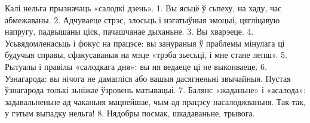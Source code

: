 Калі нельга прызначаць «салодкі дзень».
1. Вы ясьцё ў сьпеху, на хаду, час абмежаваны.
2. Адчуваеце стрэс, злосьць і нэгатыўныя эмоцыі, цягліцавую напругу, падвышаны ціск, пачашчанае дыханьне.
3. Вы хварэеце.
4. Усьвядомленасьць і фокус на працэсе: вы занураныя ў праблемы мінулага ці будучыя справы, сфакусаваныя на мэце «трэба зьесьці, і мне стане лепш».
5. Рытуалы і правілы «салодкага дня»: вы ня ведаеце ці не выконваеце.
6. Узнагарода: вы нічога не дамагліся або вашыя дасягненьні звычайныя. Пустая ўзнагарода толькі зьніжае ўзровень матывацыі.
7. Балянс «жаданьне» і «асалода»: задавальненьне ад чаканьня мацнейшае, чым ад працэсу насалоджваньня. Так-так, у гэтым выпадку нельга!
8. Нядобры посмак, шкадаваньне, трывога.
